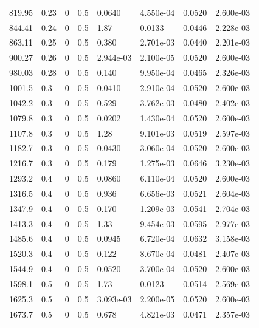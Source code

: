 \documentclass[preview]{standalone}
\begin{document}
{{\begin{tabular}{L{1.2cm}C{1.2cm} C{0.3cm}C{0.5cm} C{1.4cm}C{1.4cm} C{1.4cm}C{1.4cm}}
  819.95  &  0.23  & 0     & 0.5 &  0.0640  & 4.550e-04  & 0.0520 &  2.600e-03   \\ 
  844.41  &  0.24  & 0     & 0.5 &  1.87  & 0.0133  & 0.0446 &  2.228e-03   \\ 
  863.11  &  0.25  & 0     & 0.5 &  0.380  & 2.701e-03  & 0.0440 &  2.201e-03   \\ 
  900.27  &  0.26  & 0     & 0.5 &  2.944e-03  & 2.100e-05  & 0.0520 &  2.600e-03   \\ 
  980.03  &  0.28  & 0     & 0.5 &  0.140  & 9.950e-04  & 0.0465 &  2.326e-03   \\ 
  1001.5  &   0.3  & 0     & 0.5 &  0.0410  & 2.910e-04  & 0.0520 &  2.600e-03   \\ 
  1042.2  &   0.3  & 0     & 0.5 &  0.529  & 3.762e-03  & 0.0480 &  2.402e-03   \\ 
  1079.8  &   0.3  & 0     & 0.5 &  0.0202  & 1.430e-04  & 0.0520 &  2.600e-03   \\ 
  1107.8  &   0.3  & 0     & 0.5 &  1.28  & 9.101e-03  & 0.0519 &  2.597e-03   \\ 
  1182.7  &   0.3  & 0     & 0.5 &  0.0430  & 3.060e-04  & 0.0520 &  2.600e-03   \\ 
  1216.7  &   0.3  & 0     & 0.5 &  0.179  & 1.275e-03  & 0.0646 &  3.230e-03   \\ 
  1293.2  &   0.4  & 0     & 0.5 &  0.0860  & 6.110e-04  & 0.0520 &  2.600e-03   \\ 
  1316.5  &   0.4  & 0     & 0.5 &  0.936  & 6.656e-03  & 0.0521 &  2.604e-03   \\ 
  1347.9  &   0.4  & 0     & 0.5 &  0.170  & 1.209e-03  & 0.0541 &  2.704e-03   \\ 
  1413.3  &   0.4  & 0     & 0.5 &  1.33  & 9.454e-03  & 0.0595 &  2.977e-03   \\ 
  1485.6  &   0.4  & 0     & 0.5 &  0.0945  & 6.720e-04  & 0.0632 &  3.158e-03   \\ 
  1520.3  &   0.4  & 0     & 0.5 &  0.122  & 8.670e-04  & 0.0481 &  2.407e-03   \\ 
  1544.9  &   0.4  & 0     & 0.5 &  0.0520  & 3.700e-04  & 0.0520 &  2.600e-03   \\ 
  1598.1  &   0.5  & 0     & 0.5 &  1.73  & 0.0123  & 0.0514 &  2.569e-03   \\ 
  1625.3  &   0.5  & 0     & 0.5 &  3.093e-03  & 2.200e-05  & 0.0520 &  2.600e-03   \\ 
  1673.7  &   0.5  & 0     & 0.5 &  0.678  & 4.821e-03  & 0.0471 &  2.357e-03   \\ 

\end{tabular}}}
\end{document}
